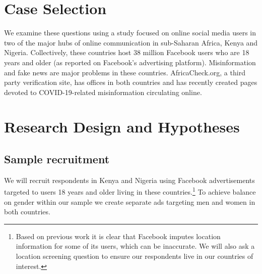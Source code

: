 \documentclass[letterpaper, 12pt, parskip=full, headsepline]{scrartcl}
\begin{document}
\section{Case Selection}

We examine these questions using a study focused on online social media users in two of the major hubs of online communication in sub-Saharan Africa, Kenya and Nigeria. Collectively, these countries host 38 million Facebook users who are 18 years and older (as reported on Facebook's advertising platform). Misinformation and fake news are major problems in these countries. AfricaCheck.org, a third party verification site, has offices in both countries and has recently created pages devoted to COVID-19-related misinformation circulating online. 


\section{Research Design and Hypotheses}



\subsection{Sample recruitment}
We will recruit respondents in Kenya and Nigeria using Facebook advertisements targeted to users 18 years and older living in these countries.\footnote{Based on previous work it is clear that Facebook imputes location information for some of its users, which can be inaccurate. We will also ask a location screening question to ensure our respondents live in our countries of interest.} To achieve balance on gender within our sample we create separate ads targeting men and women in both countries. 

\end{document}
